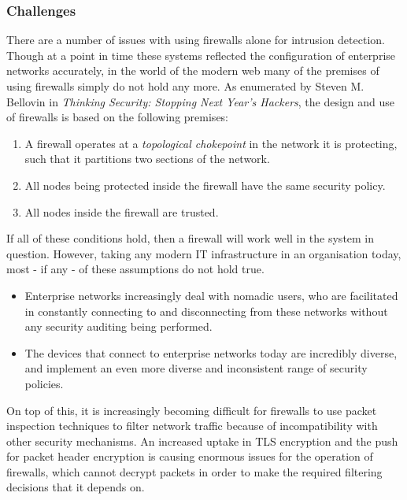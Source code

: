\subsubsection{Challenges} \label{ChallengesForFirewalls}

% 


There are a number of issues with using firewalls alone for intrusion detection. Though at a point in time these systems reflected the configuration of enterprise networks accurately, in the world of the modern web many of the premises of using firewalls simply do not hold any more. As enumerated by Steven M. Bellovin in \textit{Thinking Security: Stopping Next Year's Hackers}, \cite{ThinkingSecurityBellovin} the design and use of firewalls is based on the following premises:


\begin{enumerate}
\item A firewall operates at a \textit{topological chokepoint} in the network it is protecting, such that it partitions two sections of the network.
\item All nodes being protected inside the firewall have the same security policy.
\item All nodes inside the firewall are trusted.
\end{enumerate}

If all of these conditions hold, then a firewall will work well in the system in question. However, taking any modern IT infrastructure in an organisation today, most - if any - of these assumptions do not hold true. 
\begin{itemize}
\item Enterprise networks increasingly deal with nomadic users, who are facilitated in constantly connecting to and disconnecting from these networks without any security auditing being performed.
\item The devices that connect to enterprise networks today are incredibly diverse, and implement an even more diverse and inconsistent range of security policies.  
\end{itemize}

On top of this, it is increasingly becoming difficult for firewalls to use packet inspection techniques to filter network traffic because of incompatibility with other security mechanisms. An increased uptake in TLS encryption and the push for packet header encryption is causing enormous issues for the operation of firewalls, which cannot decrypt packets in order to make the required filtering decisions that it depends on.

